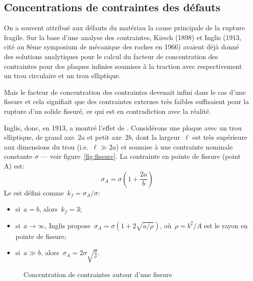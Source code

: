\subsection{Concentrations de contraintes des défauts}
\begin{histoire}%
On a souvent attribué aux défauts du matériau la cause principale de la rupture fragile.
Sur la base d'une analyse des contraintes, Kirsch (1898) et
Inglis (1913, cité au 8ème symposium de mécanique des roches en 1966)
avaient déjà donné des solutions analytiques pour le calcul du facteur de concentration des
contraintes pour des plaques infinies soumises à la traction avec respectivement un trou circulaire
et un trou elliptique.

\medskip
Mais le facteur de concentration des contraintes devenait infini dans le cas d'une fissure et cela signifiait
que des contraintes externes très faibles suffisaient pour la rupture d'un solide fissuré, ce qui est en
contradiction avec la réalité.
\end{histoire}

\medskip
Inglis, donc, en 1913, a montré l'effet de .
\medskipvm
Considérons une plaque avec un trou elliptique, de grand axe~$2a$ et petit axe~$2b$, dont la largeur~$\ell$ est très supérieure aux dimensions du trou (i.e.~$\ell\gg 2a$) et soumise à une contrainte nominale constante
$\sigma$ --- voir figure~\ref{fig:fissure}.
La contrainte en pointe de fissure (point A) est:
\begin{equation} \sigma_A = \sigma \left( 1+\frac{2a}b\right) \end{equation}
Le  est défini comme~$k_f = \sigma_A/\sigma$:
\begin{itemize}
  \item si~$a=b$, alors~$k_f=3$;
  \item si~$a\rightarrow\infty$, Inglis propose~$\sigma_A=\sigma (1+2\sqrt{a/\rho})$,
	où~$\rho=b^2/A$ est le rayon en pointe de fissure;
  \item si~$a\gg b$, alors~$\sigma_A=2\sigma \sqrt{\frac{a}{\rho}}$.
\end{itemize}
\begin{figure}[ht]\centering
{}\hspace{7em}
\caption{Concentration de contraintes autour d'une fissure}
\end{figure}

